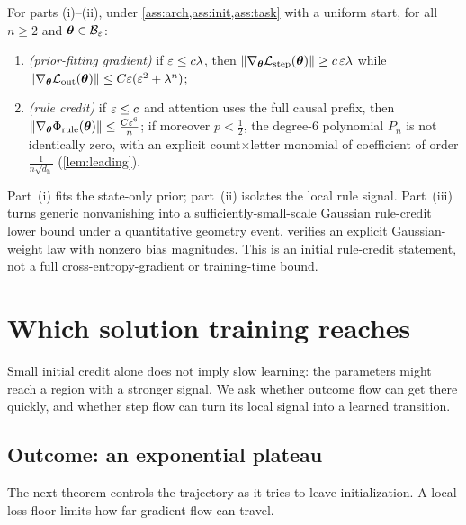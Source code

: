\begin{theorem}
\label{thm:separation}
For parts (i)--(ii), under \cref{ass:arch,ass:init,ass:task} with a uniform start,
for all $n\ge2$ and $\bm\theta\in\mathcal B_{\varepsilon}$:
\begin{enumerate}[label=(\roman*),leftmargin=*,itemsep=0pt,topsep=2pt]
\item \emph{(prior-fitting gradient)} if $\varepsilon\le c\lambda$, then $\|\nabla_{\bm\theta}\mathcal L_{\mathrm{step}}(\bm\theta)\|\ge c\,\varepsilon\lambda$ while
$\|\nabla_{\bm\theta}\mathcal L_{\mathrm{out}}(\bm\theta)\|\le C\varepsilon(\varepsilon^2+\lambda^n)$;
\item \emph{(rule credit)} if $\varepsilon\le c$ and attention uses the full causal prefix, then $\|\nabla_{\bm\theta}\Phi_{\mathrm{rule}}(\bm\theta)\|\le \frac{C\varepsilon^6}{n}$; if
moreover $p<\tfrac{1}{2}$, the degree-$6$ polynomial $P_n$ is not identically zero, with an explicit count$\times$letter monomial of
coefficient of order $\frac{1}{n\sqrt{d_{\mathrm h}}}$
(\cref{lem:leading}).

\end{enumerate}
\end{theorem}

Part~(i) fits the state-only prior; part~(ii) isolates the local rule signal.
Part~(iii) turns generic nonvanishing into a sufficiently-small-scale Gaussian rule-credit
lower bound under a quantitative geometry event. 
verifies an explicit Gaussian-weight law with nonzero bias magnitudes. This is an initial
rule-credit statement, not a full cross-entropy-gradient or training-time bound.

\section{Which solution training reaches}
\label{sec:reach}

Small initial credit alone does not imply slow learning: the parameters might reach a region with a stronger signal. We ask
whether outcome flow can get there quickly, and whether step flow can turn its local signal into a learned transition.

\subsection{Outcome: an exponential plateau}

The next theorem controls the trajectory as it tries to leave initialization. A local loss floor limits how far gradient flow can travel.

